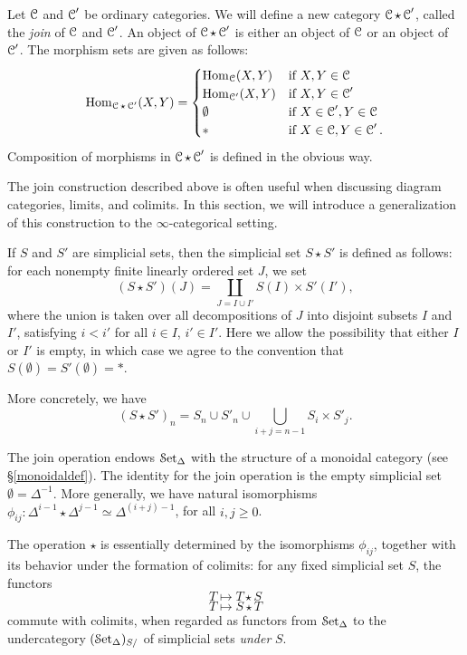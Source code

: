 \begin{Didn't Read}
Let $\operatorname{\mathcal{C}}$ and $\operatorname{\mathcal{C}}'$ be ordinary categories. We will define a
new category $\operatorname{\mathcal{C}} \star \operatorname{\mathcal{C}}'$, called the {\it join} of $\operatorname{\mathcal{C}}$ and
$\operatorname{\mathcal{C}}'$. An object of $\operatorname{\mathcal{C}} \star \operatorname{\mathcal{C}}'$ is either an object of
$\operatorname{\mathcal{C}}$ or an object of $\operatorname{\mathcal{C}}'$. The morphism sets are given as follows:
 $$\operatorname{Hom}_{\operatorname{\mathcal{C}} \star \operatorname{\mathcal{C}}'}(X,Y) = \begin{cases} \operatorname{Hom}_{\operatorname{\mathcal{C}}}(X,Y) & \text{if } X,Y \in \operatorname{\mathcal{C}} \\
\operatorname{Hom}_{\operatorname{\mathcal{C}}'}(X,Y) & \text{if } X,Y \in \operatorname{\mathcal{C}}' \\
\emptyset & \text{if } X \in \operatorname{\mathcal{C}}', Y \in \operatorname{\mathcal{C}} \\
\ast & \text{if } X \in \operatorname{\mathcal{C}}, Y \in \operatorname{\mathcal{C}}'. \end{cases}$$
Composition of morphisms in $\operatorname{\mathcal{C}} \star \operatorname{\mathcal{C}}'$ is defined in the
obvious way. 

The join construction described above is often useful when discussing diagram categories, limits, and colimits. In this section, we will introduce a generalization of this construction to the $\infty$-categorical setting.

\begin{definition}
If $S$ and $S'$ are
simplicial sets, then the simplicial set $S \star S'$ is defined as
follows: for each nonempty finite linearly ordered set $J$, we set
$$(S \star S')(J) = \coprod_{J = I \cup I'} S(I) \times
S'(I'),$$ where the union is taken over all decompositions of $J$ into disjoint subsets $I$ and $I'$, satisfying $i < i'$ for all $i \in I$, $i' \in I'$. Here we allow the
possibility that either $I$ or $I'$ is empty, in which case we agree to
the convention that $S(\emptyset) = S'(\emptyset) = \ast$.
\end{definition}

More concretely, we have $$(S \star S')_{n} =
S_n \cup S'_n \cup \bigcup_{i+j = n-1} S_i \times S'_j.$$

The join operation endows $\operatorname{\mathcal{S}et_{\Delta}}$ with the
structure of a monoidal category (see \S \ref{monoidaldef}).
The identity for the join operation is
the empty simplicial set $\emptyset = \Delta^{-1}$. More generally, we have
natural isomorphisms $\phi_{ij}: \Delta^{i-1} \star \Delta^{j-1} \simeq
\Delta^{(i+j)-1}$, for all $i, j \geq 0$.

\begin{remark}
The operation $\star$ is essentially determined by the isomorphisms
$\phi_{ij}$, together with its behavior under the formation of
colimits: for any fixed simplicial set $S$, the functors
$$ T \mapsto T \star S$$
$$ T \mapsto S \star T$$
commute with colimits, when regarded as functors from $\operatorname{\mathcal{S}et_{\Delta}}$ to
the undercategory $(\operatorname{\mathcal{S}et_{\Delta}})_{S/}$ of simplicial sets {\em under} $S$.
\end{remark}


\end{Didn't Read}
